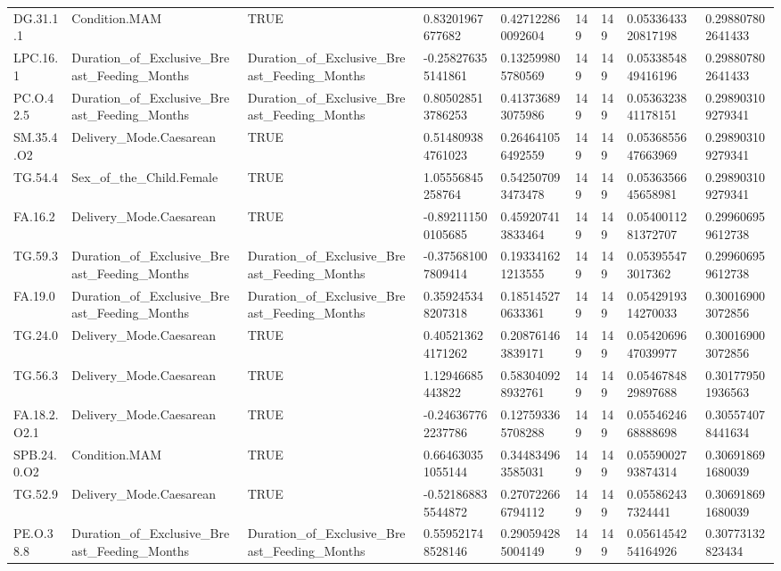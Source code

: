 \begin{longtable}{lllllllll}
DG.31.1.1 & Condition.MAM & TRUE & 0.83201967677682 & 0.427122860092604 & 149 & 149 & 0.0533643320817198 & 0.298807802641433 \\
LPC.16.1 & Duration\_of\_Exclusive\_Breast\_Feeding\_Months & Duration\_of\_Exclusive\_Breast\_Feeding\_Months & -0.258276355141861 & 0.132599805780569 & 149 & 149 & 0.0533854849416196 & 0.298807802641433 \\
PC.O.42.5 & Duration\_of\_Exclusive\_Breast\_Feeding\_Months & Duration\_of\_Exclusive\_Breast\_Feeding\_Months & 0.805028513786253 & 0.413736893075986 & 149 & 149 & 0.0536323841178151 & 0.298903109279341 \\
SM.35.4.O2 & Delivery\_Mode.Caesarean & TRUE & 0.514809384761023 & 0.264641056492559 & 149 & 149 & 0.0536855647663969 & 0.298903109279341 \\
TG.54.4 & Sex\_of\_the\_Child.Female & TRUE & 1.05556845258764 & 0.542507093473478 & 149 & 149 & 0.0536356645658981 & 0.298903109279341 \\
FA.16.2 & Delivery\_Mode.Caesarean & TRUE & -0.892111500105685 & 0.459207413833464 & 149 & 149 & 0.0540011281372707 & 0.299606959612738 \\
TG.59.3 & Duration\_of\_Exclusive\_Breast\_Feeding\_Months & Duration\_of\_Exclusive\_Breast\_Feeding\_Months & -0.375681007809414 & 0.193341621213555 & 149 & 149 & 0.053955473017362 & 0.299606959612738 \\
FA.19.0 & Duration\_of\_Exclusive\_Breast\_Feeding\_Months & Duration\_of\_Exclusive\_Breast\_Feeding\_Months & 0.359245348207318 & 0.185145270633361 & 149 & 149 & 0.0542919314270033 & 0.300169003072856 \\
TG.24.0 & Delivery\_Mode.Caesarean & TRUE & 0.405213624171262 & 0.208761463839171 & 149 & 149 & 0.0542069647039977 & 0.300169003072856 \\
TG.56.3 & Delivery\_Mode.Caesarean & TRUE & 1.12946685443822 & 0.583040928932761 & 149 & 149 & 0.0546784829897688 & 0.301779501936563 \\
FA.18.2.O2.1 & Delivery\_Mode.Caesarean & TRUE & -0.246367762237786 & 0.127593365708288 & 149 & 149 & 0.0554624668888698 & 0.305574078441634 \\
SPB.24.0.O2 & Condition.MAM & TRUE & 0.664630351055144 & 0.344834963585031 & 149 & 149 & 0.0559002793874314 & 0.306918691680039 \\
TG.52.9 & Delivery\_Mode.Caesarean & TRUE & -0.521868835544872 & 0.270722666794112 & 149 & 149 & 0.055862437324441 & 0.306918691680039 \\
PE.O.38.8 & Duration\_of\_Exclusive\_Breast\_Feeding\_Months & Duration\_of\_Exclusive\_Breast\_Feeding\_Months & 0.559521748528146 & 0.290594285004149 & 149 & 149 & 0.0561454254164926 & 0.30773132823434 \\

\end{longtable}
